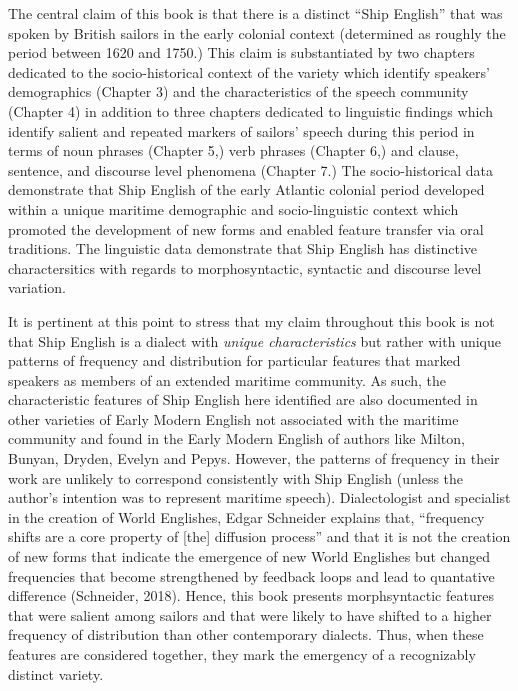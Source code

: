   The central claim of this book is that there is a distinct “Ship English” that was spoken by British sailors in the early colonial context (determined as roughly the period between 1620 and 1750.) This claim is substantiated by two chapters dedicated to the socio-historical context of the variety which identify speakers’ demographics (Chapter 3) and the characteristics of the speech community (Chapter 4) in addition to three chapters dedicated to linguistic findings which identify salient and repeated markers of sailors’ speech during this period in terms of noun phrases (Chapter 5,) verb phrases (Chapter 6,) and clause, sentence, and discourse level phenomena (Chapter 7.) The socio-historical data demonstrate that Ship English of the early Atlantic colonial period developed within a unique maritime demographic and socio-linguistic context which promoted the development of new forms and enabled feature transfer via oral traditions. The linguistic data demonstrate that Ship English has distinctive charactersitics with regards to morphosyntactic, syntactic and discourse level variation.

  It is pertinent at this point to stress that my claim throughout this book is not that Ship English is a dialect with \textit{unique characteristics} but rather with unique patterns of frequency and distribution for particular features that marked speakers as members of an extended maritime community. As such, the characteristic features of Ship English here identified are also documented in other varieties of Early Modern English not associated with the maritime community and found in the Early Modern English of authors like Milton, Bunyan, Dryden, Evelyn and Pepys. However, the patterns of frequency in their work are unlikely to correspond consistently with Ship English (unless the author’s intention was to represent maritime speech). Dialectologist and specialist in the creation of World Englishes, Edgar Schneider explains that, “frequency shifts are a core property of [the] diffusion process” and that it is not the creation of new forms that indicate the emergence of new World Englishes but changed frequencies that become strengthened by feedback loops and lead to quantative difference (Schneider, 2018). Hence, this book presents morphsyntactic features that were salient among sailors and that were likely to have shifted to a higher frequency of distribution than other contemporary dialects. Thus, when these features are considered together, they mark the emergency of a recognizably distinct variety. 

